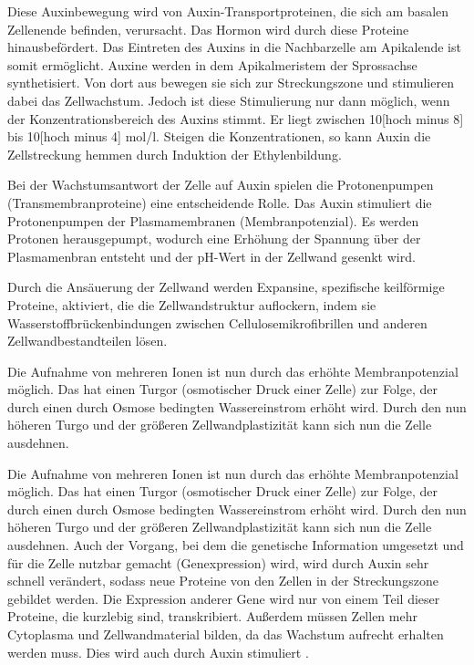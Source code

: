 \documentclass[
a4paper, 
11pt, 
ngerman,
listof=totoc,
bibliography=totocnumbered,
abstracton
]{scrreprt}
\begin{document}
Diese Auxinbewegung wird von Auxin-Transportproteinen, die sich am basalen Zellenende befinden, verursacht.
Das Hormon wird durch diese Proteine hinausbefördert. Das Eintreten des Auxins in die Nachbarzelle am Apikalende ist somit ermöglicht.
Auxine werden in dem Apikalmeristem der Sprossachse synthetisiert. Von dort aus bewegen sie sich zur Streckungszone und stimulieren dabei das Zellwachstum.
Jedoch ist diese Stimulierung nur dann möglich, wenn der Konzentrationsbereich des Auxins stimmt. Er liegt zwischen 10[hoch minus 8] bis 10[hoch minus 4] mol/l. Steigen die Konzentrationen, so kann Auxin die Zellstreckung hemmen durch Induktion der Ethylenbildung.

Bei der Wachstumsantwort der Zelle auf Auxin spielen die Protonenpumpen (Transmembranproteine) eine entscheidende Rolle. Das Auxin stimuliert die Protonenpumpen der Plasmamembranen (Membranpotenzial). Es werden Protonen herausgepumpt, wodurch eine Erhöhung der Spannung über der Plasmamenbran entsteht und der pH-Wert in der Zellwand gesenkt wird. 

Durch die Ansäuerung  der Zellwand werden Expansine, spezifische keilförmige Proteine, aktiviert, die die Zellwandstruktur auflockern, indem sie Wasserstoffbrückenbindungen zwischen Cellulosemikrofibrillen und anderen Zellwandbestandteilen lösen.

Die Aufnahme von mehreren Ionen ist nun durch das erhöhte Membranpotenzial möglich. Das hat einen Turgor (osmotischer Druck einer Zelle) zur Folge, der durch einen durch Osmose bedingten Wassereinstrom erhöht wird. Durch den nun höheren Turgo und der größeren Zellwandplastizität kann sich nun die Zelle ausdehnen.

Die Aufnahme von mehreren Ionen ist nun durch das erhöhte Membranpotenzial möglich. Das hat einen Turgor (osmotischer Druck einer Zelle) zur Folge, der durch einen durch Osmose bedingten Wassereinstrom erhöht wird. Durch den nun höheren Turgo und der größeren Zellwandplastizität kann sich nun die Zelle ausdehnen.
Auch der Vorgang, bei dem die genetische Information umgesetzt  und für die Zelle nutzbar gemacht (Genexpression) wird, wird durch Auxin sehr schnell verändert, sodass neue Proteine von den Zellen in der Streckungszone gebildet werden.
Die Expression anderer Gene wird nur von einem Teil dieser Proteine, die kurzlebig sind, transkribiert. 
Außerdem müssen Zellen mehr Cytoplasma und Zellwandmaterial bilden, da das Wachstum aufrecht erhalten werden muss. Dies wird auch durch Auxin stimuliert \parencite[1118ff]{campbell}.
\end{document}
